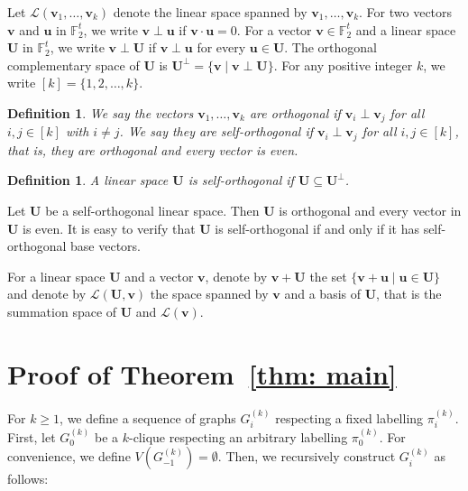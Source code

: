 \documentclass[
final
]{dmtcs-episciences}
\newtheorem{definition}[theorem]{Definition}
\begin{document}
Let $\mathcal{L}(\mathbf{v}_1, \ldots, \mathbf{v}_k)$ denote the linear space spanned by $\mathbf{v}_1, \ldots, \mathbf{v}_k$.
For two vectors $\mathbf{v}$ and $\mathbf{u}$ in $\mathbb{F}_2^t$, we write $\mathbf{v \perp u}$ if $\mathbf{v \cdot u} = 0$.
For a vector $\mathbf{v}\in \mathbb{F}_2^t$ and a linear space $\mathbf{U}$ in $\mathbb{F}_2^t$, we write $\mathbf{v \perp U}$ if $\mathbf{v \perp u}$ for every $ \mathbf{u \in U}$. The orthogonal complementary space of $\mathbf{U}$ is $\mathbf{U}^{\perp} = \{ \mathbf{v} \mid \mathbf{v \perp U}\}$. For any positive integer $k$, we write $[k] = \{1,2,\ldots, k\}$.

\begin{definition}
    We say the vectors $\mathbf{v}_1, \ldots, \mathbf{v}_k$ are orthogonal if $\mathbf{v}_i \perp \mathbf{v}_j $ for all $i, j \in [k]$ with $i \neq j$.
    We say they are self-orthogonal if $\mathbf{v}_i \perp \mathbf{v}_j$ for all $i, j \in [k]$, that is, they are orthogonal and every vector is even.
\end{definition}

\begin{definition}
    A linear space $\mathbf{U}$ is self-orthogonal if $\mathbf{U \subseteq U^{\perp}}$.
\end{definition}

Let $\mathbf{U}$ be a self-orthogonal linear space. Then $\mathbf{U}$ is orthogonal and every vector in $\mathbf{U}$ is even.
It is easy to verify that $\mathbf{U}$ is self-orthogonal if and only if it has self-orthogonal base vectors.

For a linear space $\mathbf{U}$ and a vector $\mathbf{v}$, denote by $\mathbf{v + U}$ the set $\{ \mathbf{v+u} \mid \mathbf{u \in U}\}$ and denote by $\mathcal{L}(\mathbf{U,v})$ the space spanned by $\mathbf{v}$ and a basis of $\mathbf{U}$, that is the summation space of $\mathbf{U}$ and $\mathcal{L}(\mathbf{v})$.



\section{Proof of Theorem~\ref{thm: main}}\label{sec: main}


For  $k \ge 1$, we define a sequence of graphs $G_i^{(k)}$ respecting a fixed labelling $\pi_i^{(k)}$.
First, let $G_0^{(k)}$ be a $k$-clique respecting an arbitrary labelling $\pi_0^{(k)}$.
For convenience, we define $V(G^{(k)}_{-1}) = \emptyset$.
Then, we recursively construct $G_i^{(k)}$ as follows:
\end{document}
